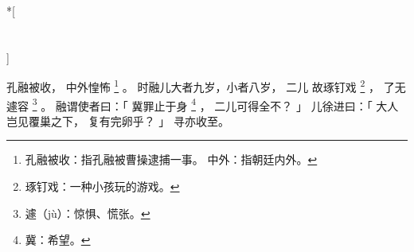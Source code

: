 
\switchcolumn[0]*[\section{}]

孔融被收，
中外惶怖%
\footnote{%
    孔融被收：指孔融被曹操逮捕一事。
    中外：指朝廷内外。
}%
。
时融儿大者九岁，小者八岁，
二儿
故琢钉戏%
\footnote{%
    琢钉戏：一种小孩玩的游戏。
}%
，
了无遽容%
\footnote{%
    遽（jù）：惊惧、慌张。
}%
。
融谓使者曰：「
    冀罪止于身%
    \footnote{%
        冀：希望。
    }%
    ，
    二儿可得全不？
」
儿徐进曰：「
    大人岂见覆巢之下，
    复有完卵乎？
」
寻亦收至。

\switchcolumn



